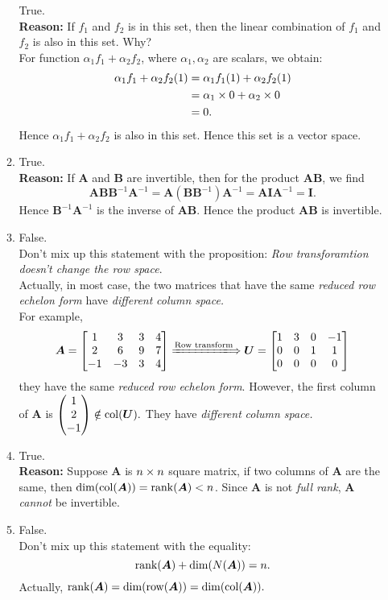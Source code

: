 \begin{enumerate}
\begin{enumerate}
True.\\
\textbf{Reason: }If $f_1$ and $f_2$ is in this set, then the linear combination of $f_1$ and $f_2$ is also in this set. Why? \\
For function $\alpha_1f_1+\alpha_2f_2$, where $\alpha_1,\alpha_2$ are scalars, we obtain:
\begin{align*}
\alpha_1f_1+\alpha_2f_2(1)&=\alpha_1f_1(1)+\alpha_2f_2(1)\\
&=\alpha_1\times0+\alpha_2\times0\\
&=0.
\end{align*}
Hence $\alpha_1f_1+\alpha_2f_2$ is also in this set. Hence this set is a vector space.
\item
True.\\
\textbf{Reason: }If $\bm A$ and $\bm B$ are invertible, then for the product $\bm{AB}$, we find
\[
\bm{AB}\bm B^{-1}\bm A^{-1}=\bm A(\bm B\bm B^{-1})\bm A^{-1}=\bm A\bm I\bm A^{-1}=\bm I.
\]
Hence $\bm B^{-1}\bm A^{-1}$ is the inverse of $\bm{AB}$. Hence the product $\bm{AB}$ is invertible.
\item
False.\\
Don't mix up this statement with the proposition:\textit{ Row transforamtion doesn't change the row space}.\\
Actually, in most case, the two matrices that have the same \textit{reduced row echelon form} have \emph{different} \textit{column space.}\\
For example,
\[
\bm A=\begin{bmatrix}
1&3&3&4\\2&6&9&7\\-1&-3&3&4
\end{bmatrix}\xLongrightarrow{\text{Row transform}}
\bm U=\begin{bmatrix}
1&3&0&-1\\0&0&1&1\\0&0&0&0
\end{bmatrix}
\]
they have the same \textit{reduced row echelon form}. However, the first column of $\bm A$ is $\begin{pmatrix}
1\\2\\-1
\end{pmatrix}\notin\operatorname{col}(\bm U).$ They have \emph{different} \textit{column space.}
\item
True.\\
\textbf{Reason: }Suppose $\bm A$ is $n\times n$ square matrix, if two columns of $\bm A$ are the same, then $\dim(\operatorname{col}(\bm A))=\operatorname{rank}(\bm A)<n$. Since $\bm A$ is not \textit{full rank}, $\bm A$ \textit{cannot} be invertible.
\item
False.\\
Don't mix up this statement with the equality:
\[
\operatorname{rank}(\bm A)+\dim(N(\bm A))=n.
\]
Actually, $\operatorname{rank}(\bm A)=\dim(\operatorname{row}(\bm A))=\dim(\operatorname{col}(\bm A)).$
\end{enumerate}
\end{enumerate}
